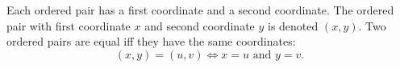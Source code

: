 Each ordered pair has a first coordinate and a second coordinate. The ordered pair with first coordinate $x$ and second coordinate $y$ is denoted $(x,y)$. Two ordered pairs are equal iff they have the same coordinates:
$$
(x,y) = (u,v) \iff x = u \text{ and } y = v.
$$
